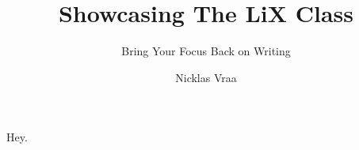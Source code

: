 \documentclass[tome]{lix}
\title     {Showcasing The LiX Class}
\subtitle  {Bring Your Focus Back on Writing}
\author    {Nicklas Vraa}
\begin{document}
Hey.
\end{document}
